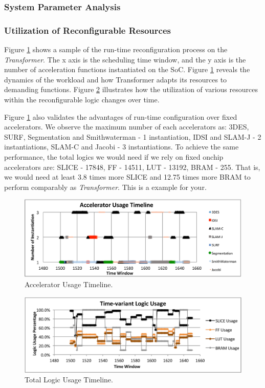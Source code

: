 \subsubsection{System Parameter Analysis}


\subsubsection{Utilization of Reconfigurable Resources}

Figure \ref{fig_acc_timeline} shows a sample of the run-time
reconfiguration process on the {\em Transformer}. The x axis is the
scheduling time window, and the y axis is the number of acceleration
functions instantiated on the SoC. Figure \ref{fig_acc_timeline}
reveals the dynamics of the workload and how {Transformer} adapts its
resources to demanding functions. Figure \ref{fig_logic_timeline}
illustrates how the utilization of various resources within the
reconfigurable logic changes over time.

Figure  \ref{fig_acc_timeline}  also validates the advantages of run-time
configuration over fixed accelerators. We observe the maximum number of each
accelerators as: 3DES, SURF, Segmentation and Smithwaterman - 1
instantiation, IDSI and SLAM-J - 2 instantiations, SLAM-C and Jacobi -
3 instantiations. To achieve the same performance, the total logics we
would need if we rely on fixed onchip accelerators are: SLICE - 17848, FF
- 14511, LUT - 13192, BRAM - 255. That is, we would need at least 3.8 times
more SLICE and 12.75 times more BRAM to perform comparably as {\em Transformer}. 
This is a example for your.


\begin{figure}[ht]
    \centering
    \includegraphics[width=6.0in]{Acc_timeline}
    \caption{Accelerator Usage Timeline.}
    \label{fig_acc_timeline}
\end{figure}

\begin{figure}[ht]
    \centering
    \includegraphics[width=6.0in]{Logic-Usage-Timeline}
    \caption{Total Logic Usage Timeline.}
    \label{fig_logic_timeline}
\end{figure}
